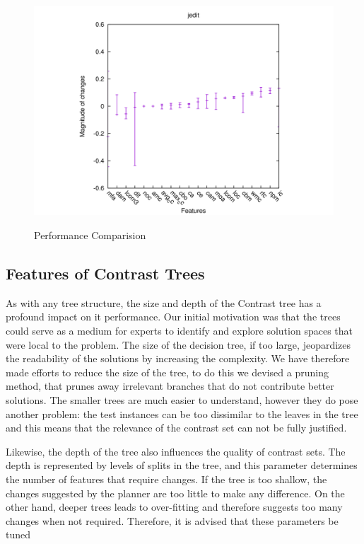 \documentclass[conference]{IEEEtran}
\begin{document}
\begin{figure}[!t]
\begin{minipage}{0.5\linewidth}
{				\includegraphics[width=\linewidth]{jedit2.png}}
		\end{minipage}
		\caption{Performance Comparision}
		\label{deltas}
	\end{figure}
	
	\subsection{Features of Contrast Trees}
As with any tree structure, the size and depth of the Contrast tree has a profound impact on it performance. Our initial motivation was that the trees could serve as a medium for experts to identify and explore solution spaces that were local to the problem. The size of the decision tree, if too large, jeopardizes the readability of the solutions by increasing the complexity. We have therefore made efforts to reduce the size of the tree, to do this we devised a pruning method, that prunes away irrelevant branches that do not contribute better solutions. The smaller trees are much easier to understand, however they do pose another problem: the test instances can be too dissimilar to the leaves in the tree and this means that the relevance of the contrast set can not be fully justified.
	
Likewise, the depth of the tree also influences the quality of contrast sets. The depth is represented by levels of splits in the tree, and this parameter determines the number of features that require changes. If the tree is too shallow, the changes suggested by the planner are too little to make any difference. On the other hand, deeper trees leads to over-fitting and therefore suggests too many changes when not required. Therefore, it is advised that these parameters be tuned
\end{document}
